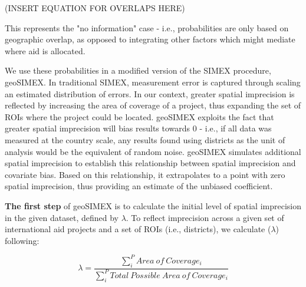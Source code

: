 (INSERT EQUATION FOR OVERLAPS HERE)

This represents the "no information" case - i.e., probabilities are only based on geographic overlap, as opposed to integrating other factors which might mediate where aid is allocated.
\par
We use these probabilities in a modified version of the SIMEX procedure, geoSIMEX.  
In traditional SIMEX, measurement error is captured through scaling an estimated distribution of errors.
In our context, greater spatial imprecision is reflected by increasing the area of coverage of a project, thus expanding the set of ROIs where the project could be located. 
geoSIMEX exploits the fact that greater spatial imprecision will bias results towards 0 - i.e., if all data was measured at the country scale, any results found using districts as the unit of analysis would be the equivalent of random noise.
geoSIMEX simulates additional spatial imprecision to establish this relationship between spatial imprecision and covariate bias. 
Based on this relationship, it extrapolates to a point with zero spatial imprecision, thus providing an estimate of the unbiased coefficient.
\par

\textbf{The first step} of geoSIMEX is to calculate the initial level of spatial imprecision in the given dataset, defined by $\lambda$.
To reflect imprecision across a given set of international aid projects and a set of ROIs (i.e., districts), we calculate (\begin{math}\lambda\end{math}) following:

\begin{equation}\label{lambda}
\lambda = \frac{\sum_{i}^{P}Area \ of \ Coverage_i}{\sum_{i}^{P}Total \ Possible \ Area \ of \ Coverage_i}
\end{equation}

